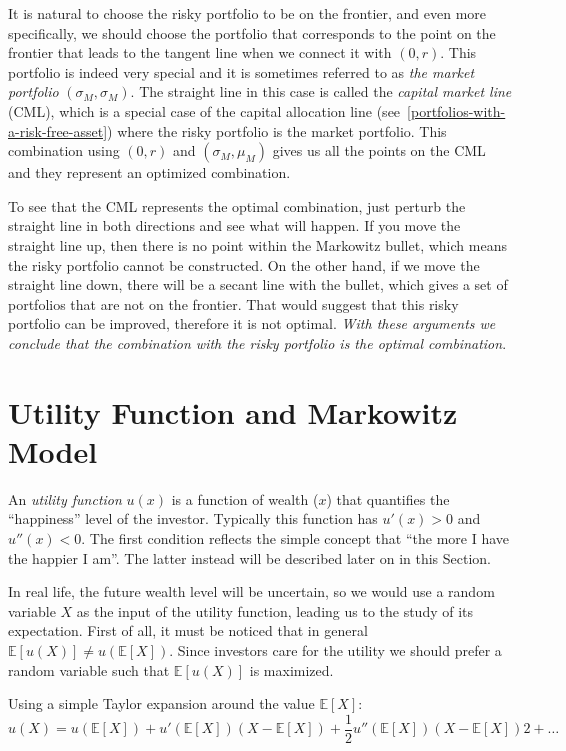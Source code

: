 It is natural to choose the risky portfolio to be on the frontier, and even more specifically, we should choose the portfolio that corresponds to the point on the frontier that leads to the tangent line when we connect it with $(0, r)$. This portfolio is indeed very special and it is sometimes referred to as \emph{the market portfolio} $(\sigma_M, \sigma_M)$.
The straight line in this case is called the \emph{capital market line} (CML), which is a special case of the capital allocation line (see~\ref{portfolios-with-a-risk-free-asset}) where the risky portfolio is the market portfolio. This combination using $(0, r)$ and $(\sigma_M, \mu_M)$ gives us all the points on the CML and they represent an optimized combination.

To see that the CML represents the optimal combination, just perturb the straight line in both directions and see what will happen. If you move the straight line up, then there is no point within the Markowitz bullet, which means the risky portfolio cannot be constructed. On the other hand, if we move the straight line down, there will be a secant line with the bullet, which gives a set of portfolios that are not on the frontier. That would suggest that this risky portfolio can be improved, therefore it is not optimal. \emph{With these arguments we conclude that the combination with the risky portfolio is the optimal combination}.

\section{Utility Function and Markowitz Model}

An \emph{utility function} $u(x)$ is a function of wealth ($x$) that quantifies the ``happiness'' level of the investor. Typically this function has $u'(x) > 0$ and $u''(x) < 0$. The first condition reflects the simple concept that ``the more I have the happier I am''. The latter instead will be described later on in this Section.

In real life, the future wealth level will be uncertain, so we would use a random variable $X$ as the input of the utility function, leading us to the study of its expectation. First of all, it must be noticed that in general $\mathbb{E}[u(X)] \neq u(\mathbb{E}[X])$.
Since investors care for the utility we should prefer a random variable such that $\mathbb{E}[u(X)]$ is maximized.

Using a simple Taylor expansion around the value $\mathbb{E}[X]$:
\begin{equation*}
u(X) = u (\mathbb{E}[X]) + u'(\mathbb{E}[X]) (X - \mathbb{E}[X]) + \frac{1}{2}u''(\mathbb{E}[X]) (X - \mathbb{E}[X])2 + \ldots
\end{equation*}

